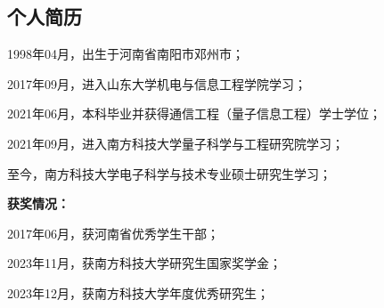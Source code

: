 
\begin{resume}

  \section*{个人简历} %

  1998年04月，出生于河南省南阳市邓州市；

  2017年09月，进入山东大学机电与信息工程学院学习；
  
  2021年06月，本科毕业并获得通信工程（量子信息工程）学士学位；

  2021年09月，进入南方科技大学量子科学与工程研究院学习；
  
  至今，南方科技大学电子科学与技术专业硕士研究生学习；

  \textbf{获奖情况：}



  2017年06月，获河南省优秀学生干部；

  2023年11月，获南方科技大学研究生国家奖学金；

  2023年12月，获南方科技大学年度优秀研究生；
  







\end{resume}
